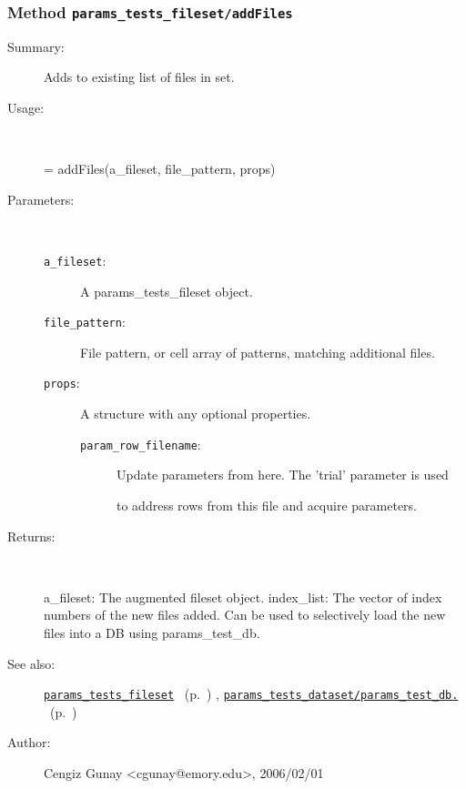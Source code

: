 \subsubsection[Method \texttt{addFiles}]{Method \texttt{params\_tests\_fileset/addFiles}}%
%
\label{ref_params_tests_fileset__addFiles}%
\hypertarget{ref_params_tests_fileset__addFiles}{}%
\begin{description}
\item[Summary:]Adds to existing list of files in set.
%
\item[Usage:]~%
\begin{lyxcode}%
[a\_fileset, index\_list] = addFiles(a\_fileset, file\_pattern, props)
%
\end{lyxcode}%
%
%
\item[Parameters:]~
\begin{description}%
\item[\texttt{a\_fileset}:]
 A params\_tests\_fileset object.
\item[\texttt{file\_pattern}:]
 File pattern, or cell array of patterns, matching additional files.
\item[\texttt{props}:]
 A structure with any optional properties.
\begin{description}%
\item[\texttt{param\_row\_filename}:]
 Update parameters from here. The 'trial' parameter is used

to address rows from this file and acquire parameters.
\end{description}%
\end{description}%
%
\item[Returns:
]~

	a\_fileset: The augmented fileset object.
	index\_list: The vector of index numbers of the new files added. Can be used
		to selectively load the new files into a DB using params\_test\_db.
%
%
\item[See also:]%
\hyperlink{ref_params_tests_fileset}{\texttt{params\_tests\_fileset}}%
\ (p.~\pageref{ref_params_tests_fileset})%
%
, \hyperlink{ref_params_tests_dataset__params_test_db.}{\texttt{params\_tests\_dataset/params\_test\_db.}}%
\ (p.~\pageref{ref_params_tests_dataset__params_test_db.})%
%
%
\item[Author:]%
Cengiz Gunay <cgunay@emory.edu>, 2006/02/01
%
\end{description}
\methodline%
